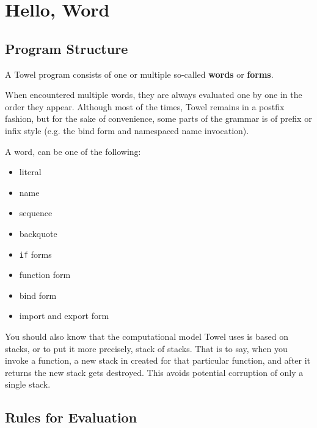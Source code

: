 \documentclass{report}
\begin{document}
\chapter{Hello, Word}
\label{chap:forms}

\section{Program Structure}\label{sec:basics}

A Towel program consists of one or multiple so-called \textbf{words} or \textbf{forms}.

When encountered multiple words, they are always evaluated one by one in the order they appear. Although most of the times, Towel remains in a postfix fashion, but for the sake of convenience, some parts of the grammar is of prefix or infix style (e.g. the bind form and namespaced name invocation).

A word, can be one of the following:
\begin{itemize}
\item literal
\item name
\item sequence
\item backquote
\item \texttt{if} forms
\item function form
\item bind form
\item import and export form
\end{itemize}

You should also know that the computational model Towel uses is based on stacks, or to put it more precisely, stack of stacks. That is to say, when you invoke a function, a new stack in created for that particular function, and after it returns the new stack gets destroyed. This avoids potential corruption of only a single stack.

\section{Rules for Evaluation}\label{sec:eval-rule}
\end{document}
